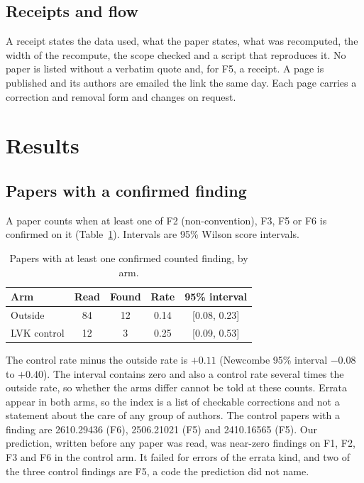 \documentclass[reprint,amsmath,amssymb,aps,superscriptaddress,nofootinbib]{revtex4-2}
\begin{document}
\subsection{Receipts and flow}

A receipt states the data used, what the paper states, what was recomputed, the width of the recompute, the scope checked and a script that reproduces it. No paper is listed without a verbatim quote and, for F5, a receipt. A page is published and its authors are emailed the link the same day. Each page carries a correction and removal form and changes on request.

\section{Results}

\subsection{Papers with a confirmed finding}
\label{sec:rates}

A paper counts when at least one of F2 (non-convention), F3, F5 or F6 is confirmed on it (Table~\ref{tab:rates}). Intervals are 95\% Wilson score intervals.

\begin{table}[t]
\caption{Papers with at least one confirmed counted finding, by arm.}
\label{tab:rates}
\centering\small\setlength{\tabcolsep}{4pt}
\begin{tabular}{lcccc}
\hline\hline
Arm & Read & Found & Rate & 95\% interval \\ \hline
Outside & 84 & 12 & 0.14 & [0.08, 0.23] \\
LVK control & 12 & 3 & 0.25 & [0.09, 0.53] \\
\hline\hline
\end{tabular}
\end{table}

The control rate minus the outside rate is $+0.11$ (Newcombe 95\% interval $-0.08$ to $+0.40$). The interval contains zero and also a control rate several times the outside rate, so whether the arms differ cannot be told at these counts. Errata appear in both arms, so the index is a list of checkable corrections and not a statement about the care of any group of authors. The control papers with a finding are 2610.29436 (F6), 2506.21021 (F5) and 2410.16565 (F5). Our prediction, written before any paper was read, was near-zero findings on F1, F2, F3 and F6 in the control arm. It failed for errors of the errata kind, and two of the three control findings are F5, a code the prediction did not name.
\end{document}
